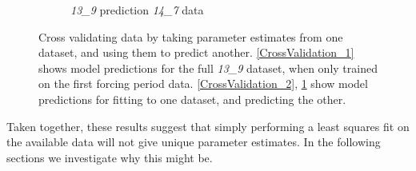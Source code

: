 \documentclass[10pt,journal]{./IEEE_latex_class/IEEEtran}
\begin{document}
\begin{figure}[h]
\begin{subfigure}[h]{0.49\textwidth}
        \caption{\textit{13\_9} prediction \textit{14\_7} data}
                \label{CrossValidation_3} 
    \end{subfigure}
    \caption{Cross validating data by taking parameter estimates from one dataset, and using them to predict another. \ref{CrossValidation_1} shows model predictions for the full \textit{13\_9} dataset, when only trained on the first forcing period data. \ref{CrossValidation_2}, \ref{CrossValidation_3} show model predictions for fitting to one dataset, and predicting the other.}
\label{CrossValidation}   
\end{figure}

 Taken together, these results suggest that simply performing a least squares fit on the available data will not give unique parameter estimates. In the following sections we investigate why this might be.
 
\end{document}
